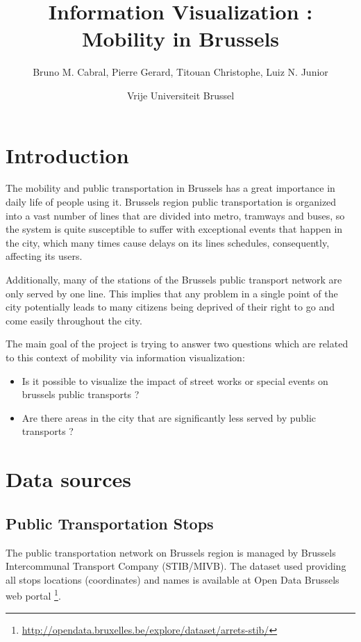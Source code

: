 \documentclass[11pt]{article}%
\begin{document}
\title{Information Visualization : Mobility in Brussels}
\author{Bruno M. Cabral, Pierre Gerard, Titouan Christophe, Luiz N. Junior}
\date{Vrije Universiteit Brussel}
\maketitle


\section{Introduction}
The mobility and public transportation in Brussels has a great importance in daily life of people using it.  Brussels region public transportation is organized into a vast number of lines that are divided into metro, tramways and buses, so the system is quite susceptible to suffer with exceptional events that happen in the city, which many times cause delays on its lines schedules, consequently, affecting its users.

Additionally, many of the stations of the Brussels public transport network are only served by one line. This implies that any problem in a single point of the city potentially leads to many citizens being deprived of their right to go and come easily throughout the city.

The main goal of the project is trying to answer two questions which are related to this context of mobility via information visualization:

\begin{itemize}
	\item Is it possible to visualize the impact of street works or special events on brussels public transports ?
	\item Are there areas in the city that are significantly less served by public transports ?
\end{itemize}


\section{Data sources}
\subsection{Public Transportation Stops}
The public transportation network on Brussels region is managed by Brussels Intercommunal Transport Company (STIB/MIVB). The dataset used providing all stops locations (coordinates) and names is available at Open Data Brussels web portal \footnote{\url{http://opendata.bruxelles.be/explore/dataset/arrets-stib/}}.
\end{document}
